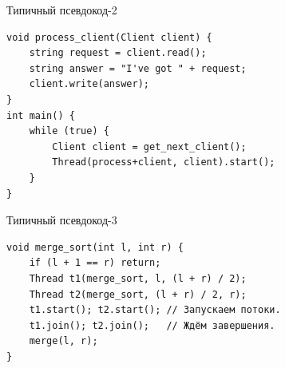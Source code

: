 \begin{frame}[fragile]{Типичный псевдокод-2}
\begin{verbatim}
void process_client(Client client) {
    string request = client.read();
    string answer = "I've got " + request;
    client.write(answer);
}
int main() {
    while (true) {
        Client client = get_next_client();
        Thread(process+client, client).start();
    }
}
\end{verbatim}
\end{frame}

\begin{frame}[fragile]{Типичный псевдокод-3}
\begin{verbatim}
void merge_sort(int l, int r) {
    if (l + 1 == r) return;
    Thread t1(merge_sort, l, (l + r) / 2);
    Thread t2(merge_sort, (l + r) / 2, r);
    t1.start(); t2.start(); // Запускаем потоки.
    t1.join(); t2.join();   // Ждём завершения.
    merge(l, r);
}
\end{verbatim}
\end{frame}
